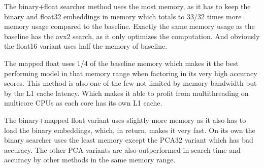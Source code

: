 The binary+float searcher method uses the most memory, as it has to keep the binary and float32 embeddings in memory which totals to 33/32 times more memory usage compared to the baseline. Exactly the same memory usage as the baseline has the avx2 search, as it only optimizes the computation. And obviously the float16 variant uses half the memory of baseline.

The mapped float uses 1/4 of the baseline memory which makes it the best performing model in that memory range when factoring in its very high accuracy scores. This method is also one of the few not limited by memory bandwidth but by the L1 cache latency. Which makes it able to profit from multithreading on multicore CPUs as each core has its own L1 cache.

The binary+mapped float variant uses slightly more memory as it also has to load the binary embeddings, which, in return, makes it very fast. On its own the binary searcher uses the least memory except the PCA32 variant which has bad accuracy. The other PCA variants are also outperformed in search time and accuracy by other methods in the same memory range.

